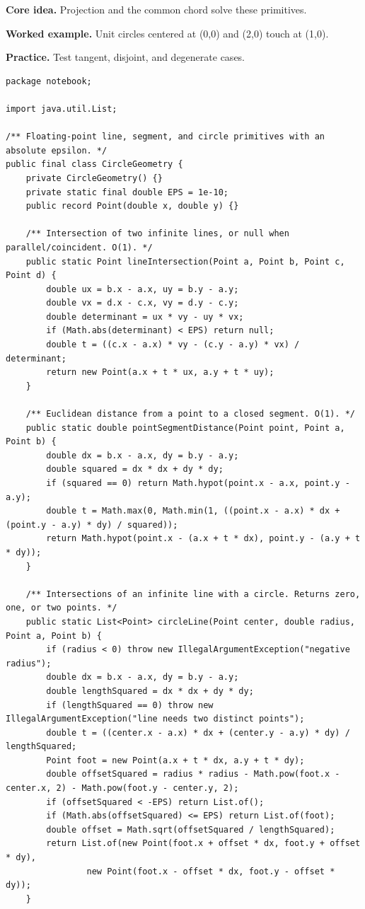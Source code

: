 \documentclass[10pt,letterpaper]{article}
\begin{document}
\noindent\textbf{Core idea.} Projection and the common chord solve these primitives.\par
\noindent\textbf{Worked example.} Unit circles centered at (0,0) and (2,0) touch at (1,0).\par
\noindent\textbf{Practice.} Test tangent, disjoint, and degenerate cases.\par
\begin{lstlisting}
package notebook;

import java.util.List;

/** Floating-point line, segment, and circle primitives with an absolute epsilon. */
public final class CircleGeometry {
    private CircleGeometry() {}
    private static final double EPS = 1e-10;
    public record Point(double x, double y) {}

    /** Intersection of two infinite lines, or null when parallel/coincident. O(1). */
    public static Point lineIntersection(Point a, Point b, Point c, Point d) {
        double ux = b.x - a.x, uy = b.y - a.y;
        double vx = d.x - c.x, vy = d.y - c.y;
        double determinant = ux * vy - uy * vx;
        if (Math.abs(determinant) < EPS) return null;
        double t = ((c.x - a.x) * vy - (c.y - a.y) * vx) / determinant;
        return new Point(a.x + t * ux, a.y + t * uy);
    }

    /** Euclidean distance from a point to a closed segment. O(1). */
    public static double pointSegmentDistance(Point point, Point a, Point b) {
        double dx = b.x - a.x, dy = b.y - a.y;
        double squared = dx * dx + dy * dy;
        if (squared == 0) return Math.hypot(point.x - a.x, point.y - a.y);
        double t = Math.max(0, Math.min(1, ((point.x - a.x) * dx + (point.y - a.y) * dy) / squared));
        return Math.hypot(point.x - (a.x + t * dx), point.y - (a.y + t * dy));
    }

    /** Intersections of an infinite line with a circle. Returns zero, one, or two points. */
    public static List<Point> circleLine(Point center, double radius, Point a, Point b) {
        if (radius < 0) throw new IllegalArgumentException("negative radius");
        double dx = b.x - a.x, dy = b.y - a.y;
        double lengthSquared = dx * dx + dy * dy;
        if (lengthSquared == 0) throw new IllegalArgumentException("line needs two distinct points");
        double t = ((center.x - a.x) * dx + (center.y - a.y) * dy) / lengthSquared;
        Point foot = new Point(a.x + t * dx, a.y + t * dy);
        double offsetSquared = radius * radius - Math.pow(foot.x - center.x, 2) - Math.pow(foot.y - center.y, 2);
        if (offsetSquared < -EPS) return List.of();
        if (Math.abs(offsetSquared) <= EPS) return List.of(foot);
        double offset = Math.sqrt(offsetSquared / lengthSquared);
        return List.of(new Point(foot.x + offset * dx, foot.y + offset * dy),
                new Point(foot.x - offset * dx, foot.y - offset * dy));
    }


\end{lstlisting}
\end{document}
